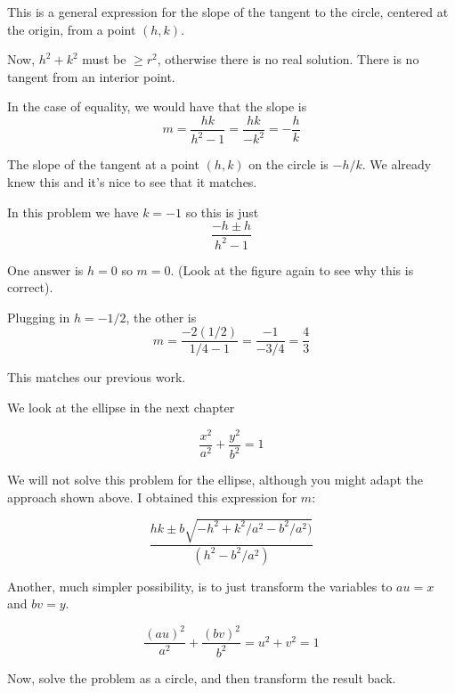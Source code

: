 \documentclass[11pt, oneside]{article}
\begin{document}
This is a general expression for the slope of the tangent to the circle, centered at the origin, from a point $(h,k)$.

Now, $h^2 + k^2$ must be $ \ge r^2$, otherwise there is no real solution.  There is no tangent from an interior point.

In the case of equality, we would have that the slope is 
\[ m = \frac{hk}{h^2 - 1} = \frac{hk}{-k^2} = -\frac{h}{k} \]

The slope of the tangent at a point $(h,k)$ on the circle is $-h/k$.  We already knew this and it's nice to see that it matches.

In this problem we have $k = -1$ so this is just
\[ \frac{-h \pm h}{h^2 - 1} \]

One answer is $h = 0$ so $m=0$.  (Look at the figure again to see why this is correct).

Plugging in $h = -1/2$, the other is
\[ m = \frac{-2(1/2)}{1/4 - 1} = \frac{-1}{-3/4} = \frac{4}{3}  \]

This matches our previous work.

We look at the ellipse in the next chapter

\[ \frac{x^2}{a^2} + \frac{y^2}{b^2} = 1 \]

We will not solve this problem for the ellipse, although you might adapt the approach shown above.  I obtained this expression for $m$:

\[ \frac{hk \pm b \sqrt{-h^2 + k^2/a^2 - b^2/a^2)}}{(h^2 - b^2/a^2)} \]

Another, much simpler possibility, is to just transform the variables to $au = x$ and $bv = y$.

\[ \frac{(au)^2}{a^2} + \frac{(bv)^2}{b^2} = u^2 + v^2 = 1 \]

Now, solve the problem as a circle, and then transform the result back.
\end{document}
